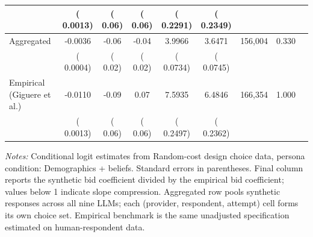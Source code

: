 \begin{table}[h]
\begin{threeparttable}
\begin{tabular}{lcccccccr}
 & (   0.0013) & (     0.06) & (     0.06) & (   0.2291) & (   0.2349) & & \\
\midrule
Aggregated &   -0.0036 &     -0.06 &     -0.04 &    3.9966 &    3.6471 &   156,004 &  0.330 \\
 & (   0.0004) & (     0.02) & (     0.02) & (   0.0734) & (   0.0745) & & \\
\midrule
Empirical (Giguere et al.) &   -0.0110 &     -0.09 &      0.07 &    7.5935 &    6.4846 &   166,354 & 1.000 \\
 & (   0.0013) & (     0.06) & (     0.06) & (   0.2497) & (   0.2362) & & \\
\bottomrule
\end{tabular}
\begin{tablenotes}\footnotesize
\item \textit{Notes:} Conditional logit estimates from Random-cost design choice data, persona condition: Demographics + beliefs. 
Standard errors in parentheses. 
Final column reports the synthetic bid coefficient divided by the empirical bid coefficient; values below 1 indicate slope compression. 
Aggregated row pools synthetic responses across all nine LLMs; each (provider, respondent, attempt) cell forms its own choice set. 
Empirical benchmark is the same unadjusted specification estimated on \textcite{Giguere2020} human-respondent data.
\end{tablenotes}
\end{threeparttable}
\end{table}
